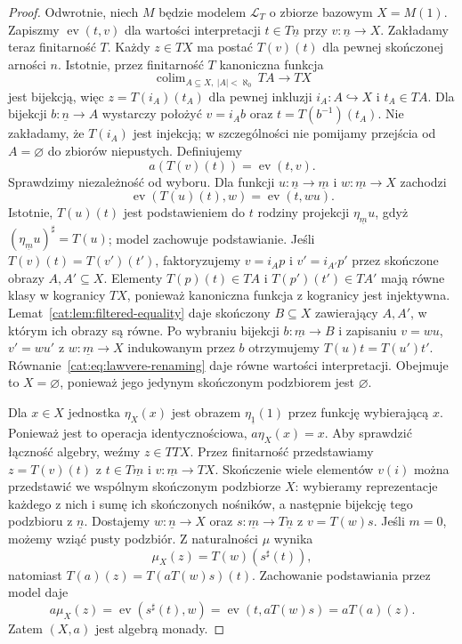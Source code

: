 \begin{proof}
Odwrotnie, niech $M$ będzie modelem $\mathcal L_T$ o zbiorze bazowym $X=M(1)$. Zapiszmy $\operatorname{ev}(t,v)$ dla wartości interpretacji $t\in T\underline n$ przy $v:\underline n\to X$. Zakładamy teraz finitarność $T$. Każdy $z\in TX$ ma postać $T(v)(t)$ dla pewnej skończonej arności $n$. Istotnie, przez finitarność $T$ kanoniczna funkcja
\[
 \operatorname{colim}_{A\subseteq X,\ |A|<\aleph_0}TA
 \longrightarrow TX
\]
jest bijekcją, więc $z=T(i_A)(t_A)$ dla pewnej inkluzji $i_A:A\hookrightarrow X$ i $t_A\in TA$. Dla bijekcji $b:\underline n\to A$ wystarczy położyć $v=i_A b$ oraz $t=T(b^{-1})(t_A)$. Nie zakładamy, że $T(i_A)$ jest injekcją; w szczególności nie pomijamy przejścia od $A=\varnothing$ do zbiorów niepustych. Definiujemy
\[
 a(T(v)(t))=\operatorname{ev}(t,v).
\]
Sprawdzimy niezależność od wyboru. Dla funkcji $u:\underline n\to\underline m$ i $w:\underline m\to X$ zachodzi
\begin{equation}\label{cat:eq:lawvere-renaming}
 \operatorname{ev}(T(u)(t),w)=\operatorname{ev}(t,wu).
\end{equation}
Istotnie, $T(u)(t)$ jest podstawieniem do $t$ rodziny projekcji $\eta_{\underline m}u$, gdyż $(\eta_{\underline m}u)^\sharp=T(u)$; model zachowuje podstawianie. Jeśli $T(v)(t)=T(v')(t')$, faktoryzujemy $v=i_A p$ i $v'=i_{A'}p'$ przez skończone obrazy $A,A'\subseteq X$. Elementy $T(p)(t)\in TA$ i $T(p')(t')\in TA'$ mają równe klasy w kogranicy $TX$, ponieważ kanoniczna funkcja z kogranicy jest injektywna. Lemat~\ref{cat:lem:filtered-equality} daje skończony $B\subseteq X$ zawierający $A,A'$, w którym ich obrazy są równe. Po wybraniu bijekcji $b:\underline m\to B$ i zapisaniu $v=w u$, $v'=w u'$ z $w:\underline m\to X$ indukowanym przez $b$ otrzymujemy $T(u)t=T(u')t'$. Równanie~\eqref{cat:eq:lawvere-renaming} daje równe wartości interpretacji. Obejmuje to $X=\varnothing$, ponieważ jego jedynym skończonym podzbiorem jest $\varnothing$.

Dla $x\in X$ jednostka $\eta_X(x)$ jest obrazem $\eta_{\underline 1}(1)$ przez funkcję wybierającą $x$. Ponieważ jest to operacja identycznościowa, $a\eta_X(x)=x$. Aby sprawdzić łączność algebry, weźmy $z\in TTX$. Przez finitarność przedstawiamy $z=T(v)(t)$ z $t\in T\underline m$ i $v:\underline m\to TX$. Skończenie wiele elementów $v(i)$ można przedstawić we wspólnym skończonym podzbiorze $X$: wybieramy reprezentacje każdego z nich i sumę ich skończonych nośników, a następnie bijekcję tego podzbioru z $\underline n$. Dostajemy $w:\underline n\to X$ oraz $s:\underline m\to T\underline n$ z $v=T(w)s$. Jeśli $m=0$, możemy wziąć pusty podzbiór. Z naturalności $\mu$ wynika
\[
 \mu_X(z)=T(w)(s^\sharp(t)),
\]
natomiast $T(a)(z)=T(aT(w)s)(t)$. Zachowanie podstawiania przez model daje
\[
 a\mu_X(z)=\operatorname{ev}(s^\sharp(t),w)
 =\operatorname{ev}(t,aT(w)s)=aT(a)(z).
\]
Zatem $(X,a)$ jest algebrą monady.


\end{proof}
